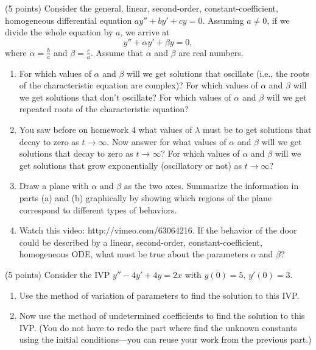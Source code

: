 

\begin{problem}[1]
(5 points) Consider the general, linear, second-order, constant-coefficient, homogeneous differential equation $ay'' + by' + cy = 0$. Assuming $a \neq 0$, if we divide the whole equation by $a$, we arrive at
\[y'' + \alpha y' + \beta y = 0,\]
where $\alpha = \frac ba$ and $\beta = \frac ca$. Assume that $\alpha$ and $\beta$ are real numbers.

\begin{enumerate}
\item For which values of $\alpha$ and $\beta$ will we get solutions that oscillate (i.e., the roots of the characteristic equation are complex)? For which values of $\alpha$ and $\beta$ will we get solutions that don’t oscillate? For which values of $\alpha$ and $\beta$ will we get repeated roots of the characteristic equation?
\item You saw before on homework 4 what values of $\lambda$ must be to get solutions that decay to zero as $t \to \infty$. Now answer for what values of $\alpha$ and $\beta$ will we get solutions that decay to zero as $t \to \infty$? For which values of $\alpha$ and $\beta$ will we get solutions that grow exponentially (oscillatory or not) as $t \to \infty$?
\item Draw a plane with $\alpha$ and $\beta$ as the two axes. Summarize the information in parts (a) and (b) graphically by showing which regions of the plane correspond to different types of behaviors.
\item Watch this video: http://vimeo.com/63064216. If the behavior of the door could be described by a linear, second-order, constant-coefficient, homogeneous ODE, what must be true about the parameters $\alpha$ and $\beta$?
\end{enumerate}
\end{problem}



\newpage
\hfill
\newpage


\begin{problem}[2]
(5 points) Consider the IVP $y'' -4y' +4y=2x$ with $y(0)=5$, $y'(0)=3$.

\begin{enumerate}
\item Use the method of variation of parameters to find the solution to this IVP.
\item Now use the method of undetermined coefficients to find the solution to this IVP. (You do not have to redo the part where find the unknown constants using the initial conditions—you can reuse your work from the previous part.)
\end{enumerate}
\end{problem}


